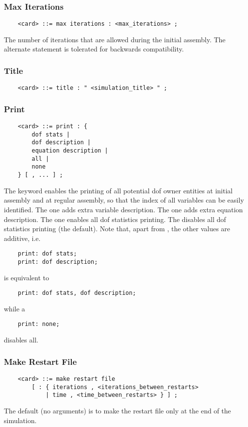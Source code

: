 \subsubsection{Max Iterations}
\begin{verbatim}
    <card> ::= max iterations : <max_iterations> ;
\end{verbatim}
The number of iterations that are allowed during the initial assembly.
The alternate statement  is tolerated
for backwards compatibility.

\subsubsection{Title}
\begin{verbatim}
    <card> ::= title : " <simulation_title> " ;
\end{verbatim}

\subsubsection{Print}
\begin{verbatim}
    <card> ::= print : {
        dof stats |
        dof description |
        equation description |
        all |
        none
    } [ , ... ] ;
\end{verbatim}
The  keyword enables the printing of all potential
dof owner entities at initial assembly and at regular assembly,
so that the index of all variables can be easily identified.
The  one adds extra variable description.
The  one adds extra equation description.
The  one enables all dof statistics printing.
The  disables all dof statistics printing (the default).
Note that, apart from , the other values are additive, i.e.
\begin{verbatim}
    print: dof stats;
    print: dof description;
\end{verbatim}
is equivalent to 
\begin{verbatim}
    print: dof stats, dof description;
\end{verbatim}
while a 
\begin{verbatim}
    print: none;
\end{verbatim}
disables all.

\subsubsection{Make Restart File}
\begin{verbatim}
    <card> ::= make restart file
        [ : { iterations , <iterations_between_restarts>
            | time , <time_between_restarts> } ] ;
\end{verbatim}
The default (no arguments) is to make the restart file only at the end of
the simulation.

